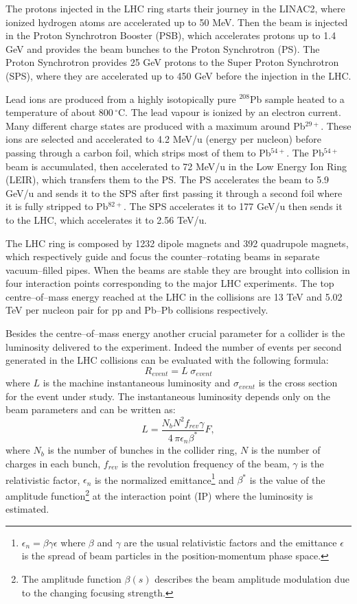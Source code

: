 The protons injected in the LHC ring starts their journey in the LINAC2, where ionized hydrogen
atoms are accelerated up to 50 MeV. Then the beam is injected in the Proton Synchrotron Booster 
(PSB), which accelerates protons up to 1.4 GeV and provides the beam bunches to the Proton 
Synchrotron (PS). The Proton Synchrotron provides 25 GeV protons to the Super Proton Synchrotron
(SPS), where they are accelerated up to 450 GeV before the injection in the LHC.

Lead ions are produced from a highly isotopically pure $^{208}$Pb sample heated to a temperature
of about $800\,^{\circ}\mathrm{C}$.
The lead vapour is ionized by an electron current. Many different charge states are produced
with a maximum around Pb$^{29+}$.
These ions are selected and accelerated to 4.2 MeV/u (energy per nucleon) before passing through
a carbon foil, which strips most of them to Pb$^{54+}$. The Pb$^{54+}$ beam is accumulated, then
accelerated to 72 MeV/u in the Low Energy Ion Ring (LEIR), which transfers them to the PS.
The PS accelerates the beam to 5.9 GeV/u and sends it to the SPS after first passing it through a
second foil where it is fully stripped to Pb$^{82+}$. 
The SPS accelerates it to 177 GeV/u then sends it to the LHC, which accelerates it to 2.56 TeV/u.

The LHC ring is composed by 1232 dipole magnets and 392 quadrupole magnets, which respectively 
guide and focus the counter–rotating beams in separate vacuum–filled pipes.
When the beams are stable they are brought into collision in four interaction points corresponding
to the major LHC experiments.
The top centre–of–mass energy reached at the LHC in the collisions are 13 TeV and 5.02 TeV per 
nucleon pair for pp and Pb--Pb collisions respectively.

Besides the centre–of–mass energy another crucial parameter for a collider is the luminosity delivered 
to the experiment.
Indeed the number of events per second generated in the LHC collisions can be evaluated with the
following formula:
\begin{equation}
    R_{event} = L\;\sigma_{event}
\end{equation}
where $L$ is the machine instantaneous luminosity and $\sigma_{event}$ is the cross section for
the event under study. The instantaneous luminosity depends only on the beam parameters and can be 
written as:
\begin{equation}
    L = \frac{N_{b}N^{2} f_{rev} \gamma}{4\,\pi \epsilon_{n} \beta^{*}} F,
\end{equation}
where $N_{b}$ is the number of bunches in the collider ring, $N$ is the number of charges in each
bunch, $f_{rev}$ is the revolution frequency of the beam, $\gamma$ is the relativistic factor,
$\epsilon_{n}$ is the normalized emittance\footnote{$\epsilon_{n} = \beta \gamma \epsilon$ 
where $\beta$ and $\gamma$ are the usual relativistic factors and the emittance $\epsilon$ is the
spread of beam particles in the position-momentum phase space.} and $\beta^{*}$ is the value 
of the amplitude function\footnote{The amplitude function $\beta(s)$ describes the beam 
amplitude modulation due to the changing focusing strength.} at the interaction point (IP)
where the luminosity is estimated.


